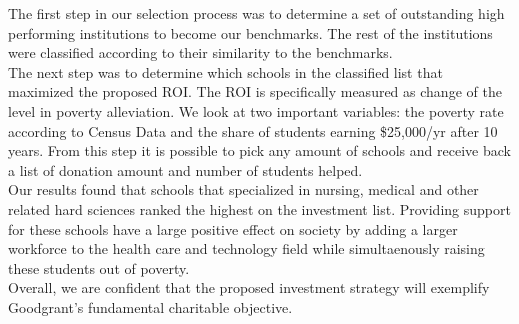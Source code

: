 \documentclass[12pt]{scrartcl}
\begin{document}
The first step in our selection process was to determine a set of outstanding high performing institutions to become our benchmarks. The rest of the institutions were classified according to their similarity to the benchmarks. \\

The next step was to determine which schools in the classified list that maximized the proposed ROI. The ROI is specifically measured as change of the level in poverty alleviation. We look at two important variables: the poverty rate according to Census Data and the share of students earning \$25,000/yr after 10 years. From this step it is possible to pick any amount of schools and receive back a list of donation amount and number of students helped. \\

Our results found that schools that specialized in nursing, medical and other related hard sciences ranked the highest on the investment list. Providing support for these schools have a large positive effect on society by adding a larger workforce to the health care and technology field while simultaenously raising these students out of poverty. \\

Overall, we are confident that the proposed investment strategy will exemplify Goodgrant’s fundamental charitable objective. 
\newpage
\end{document}
